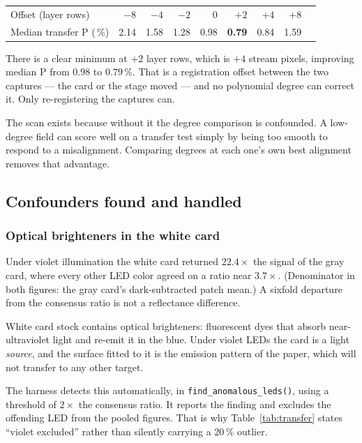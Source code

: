 \documentclass[11pt, a4paper]{article}
\newcommand{\code}[1]{\texttt{#1}}
\newcommand{\pct}{\,\%}
\begin{document}
\begin{center}
\begin{tabular}{lrrrrrrrr}
\toprule
Offset (layer rows) & $-8$ & $-4$ & $-2$ & $0$ & $+2$ & $+4$ & $+8$ \\
Median transfer P ($\pct$) & 2.14 & 1.58 & 1.28 & 0.98 & \textbf{0.79}
                           & 0.84 & 1.59 \\
\bottomrule
\end{tabular}
\end{center}

There is a clear minimum at $+2$ layer rows,
which is $+4$ stream pixels,
improving median P from $0.98$ to $0.79\pct$.
That is a registration offset between the two captures ---
the card or the stage moved ---
and no polynomial degree can correct it.
Only re-registering the captures can.

The scan exists because without it the degree comparison is confounded.
A low-degree field can score well on a transfer test
simply by being too smooth to respond to a misalignment.
Comparing degrees at each one's own best alignment removes that advantage.

\subsection{Confounders found and handled}

\subsubsection{Optical brighteners in the white card}
\label{sec:fluor}

Under violet illumination the white card returned $22.4\times$
the signal of the gray card,
where every other LED color agreed on a ratio near $3.7\times$.
(Denominator in both figures: the gray card's dark-subtracted patch mean.)
A sixfold departure from the consensus ratio
is not a reflectance difference.

White card stock contains optical brighteners:
fluorescent dyes that absorb near-ultraviolet light
and re-emit it in the blue.
Under violet LEDs the card is a light \emph{source},
and the surface fitted to it is the emission pattern of the paper,
which will not transfer to any other target.

The harness detects this automatically,
in \code{find\_anomalous\_leds()},
using a threshold of $2\times$ the consensus ratio.
It reports the finding and excludes the offending LED
from the pooled figures.
That is why Table~\ref{tab:transfer} states ``violet excluded''
rather than silently carrying a $20\pct$ outlier.
\end{document}
